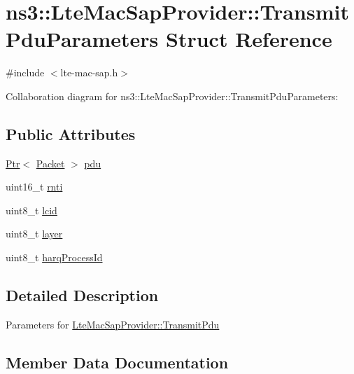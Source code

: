 \hypertarget{structns3_1_1LteMacSapProvider_1_1TransmitPduParameters}{}\section{ns3\+:\+:Lte\+Mac\+Sap\+Provider\+:\+:Transmit\+Pdu\+Parameters Struct Reference}
\label{structns3_1_1LteMacSapProvider_1_1TransmitPduParameters}


{\ttfamily \#include $<$lte-\/mac-\/sap.\+h$>$}



Collaboration diagram for ns3\+:\+:Lte\+Mac\+Sap\+Provider\+:\+:Transmit\+Pdu\+Parameters\+:
\subsection*{Public Attributes}
\begin{DoxyCompactItemize}
\item 
\hyperlink{classns3_1_1Ptr}{Ptr}$<$ \hyperlink{classns3_1_1Packet}{Packet} $>$ \hyperlink{structns3_1_1LteMacSapProvider_1_1TransmitPduParameters_aa12a35fa0d1f02ba064862815b129ae2}{pdu}
\item 
uint16\+\_\+t \hyperlink{structns3_1_1LteMacSapProvider_1_1TransmitPduParameters_a07d41388b3041bdba571683e474af540}{rnti}
\item 
uint8\+\_\+t \hyperlink{structns3_1_1LteMacSapProvider_1_1TransmitPduParameters_a1aeffc9e47e7ecda7630ad4d0dd88506}{lcid}
\item 
uint8\+\_\+t \hyperlink{structns3_1_1LteMacSapProvider_1_1TransmitPduParameters_acda6b741e598f42fe396971f5bc7a7a3}{layer}
\item 
uint8\+\_\+t \hyperlink{structns3_1_1LteMacSapProvider_1_1TransmitPduParameters_aa1394fb0cdd9851ec0920c6af56260ff}{harq\+Process\+Id}
\end{DoxyCompactItemize}


\subsection{Detailed Description}
Parameters for \hyperlink{classns3_1_1LteMacSapProvider_a125622cc614fa4ef620d595fbec0cf07}{Lte\+Mac\+Sap\+Provider\+::\+Transmit\+Pdu} 

\subsection{Member Data Documentation}
